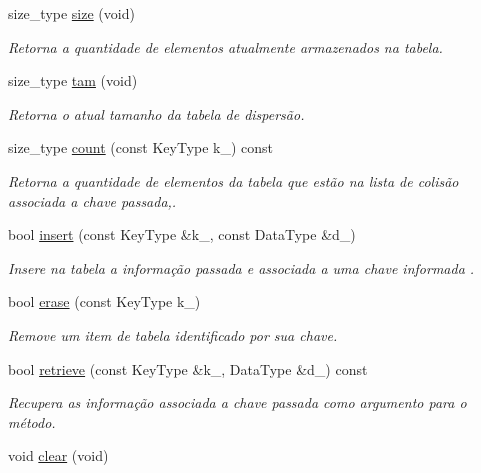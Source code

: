 \begin{DoxyCompactItemize}
size\+\_\+type \hyperlink{classac_1_1HashTbl_aaf8d8a0f28b5c39c4eeac1218bf4df44}{size} (void)
\begin{DoxyCompactList}\small\item\em Retorna a quantidade de elementos atualmente armazenados na tabela. \end{DoxyCompactList}\item 
size\+\_\+type \hyperlink{classac_1_1HashTbl_ae9f33312566bd2abfae892cda4cff19e}{tam} (void)
\begin{DoxyCompactList}\small\item\em Retorna o atual tamanho da tabela de dispersão. \end{DoxyCompactList}\item 
size\+\_\+type \hyperlink{classac_1_1HashTbl_ae5dd7b78ebf842dfb67db7005c519479}{count} (const Key\+Type k\+\_\+) const
\begin{DoxyCompactList}\small\item\em Retorna a quantidade de elementos da tabela que estão na lista de colisão associada a chave passada,. \end{DoxyCompactList}\item 
bool \hyperlink{classac_1_1HashTbl_a219a559a1a07170cc0679c5d1dfb3758}{insert} (const Key\+Type \&k\+\_\+, const Data\+Type \&d\+\_\+)
\begin{DoxyCompactList}\small\item\em Insere na tabela a informação passada e associada a uma chave informada . \end{DoxyCompactList}\item 
bool \hyperlink{classac_1_1HashTbl_af3dd2fb806673ec64a9beec2c1fd7610}{erase} (const Key\+Type k\+\_\+)
\begin{DoxyCompactList}\small\item\em Remove um item de tabela identificado por sua chave. \end{DoxyCompactList}\item 
bool \hyperlink{classac_1_1HashTbl_afd9798982409ae5a1955259190fd175e}{retrieve} (const Key\+Type \&k\+\_\+, Data\+Type \&d\+\_\+) const
\begin{DoxyCompactList}\small\item\em Recupera as informação associada a chave passada como argumento para o método. \end{DoxyCompactList}\item 
\mbox{\label{classac_1_1HashTbl_a4fda203a257af1e3913128f03926878f}} 
void \hyperlink{classac_1_1HashTbl_a4fda203a257af1e3913128f03926878f}{clear} (void)

\end{DoxyCompactItemize}
